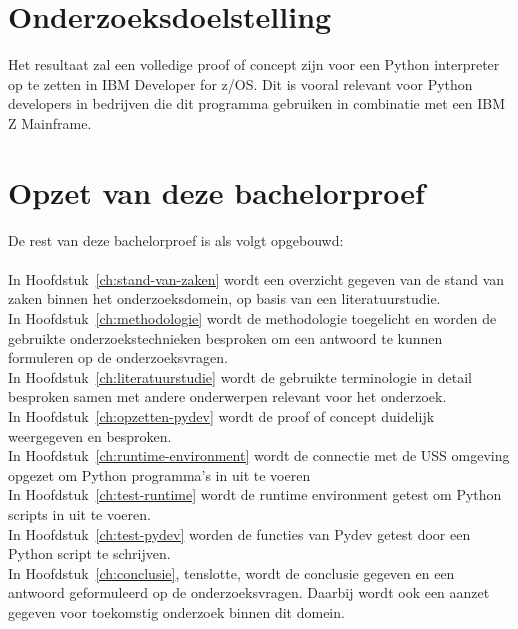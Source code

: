 \section{Onderzoeksdoelstelling}%
\label{sec:onderzoeksdoelstelling}

Het resultaat zal een volledige proof of concept zijn voor een Python interpreter op te zetten in IBM Developer for z/OS. Dit is vooral relevant voor Python developers in bedrijven die dit programma gebruiken in combinatie met een IBM Z Mainframe. 

\section{Opzet van deze bachelorproef}%
\label{sec:opzet-bachelorproef}


De rest van deze bachelorproef is als volgt opgebouwd: \\ \\

In Hoofdstuk~\ref{ch:stand-van-zaken} wordt een overzicht gegeven van de stand van zaken binnen het onderzoeksdomein, op basis van een literatuurstudie. \\

In Hoofdstuk~\ref{ch:methodologie} wordt de methodologie toegelicht en worden de gebruikte onderzoekstechnieken besproken om een antwoord te kunnen formuleren op de onderzoeksvragen. \\

In Hoofdstuk~\ref{ch:literatuurstudie} wordt de gebruikte terminologie in detail besproken samen met andere onderwerpen relevant voor het onderzoek. \\

In Hoofdstuk~\ref{ch:opzetten-pydev} wordt de proof of concept duidelijk weergegeven en besproken. \\

In Hoofdstuk~\ref{ch:runtime-environment} wordt de connectie met de USS omgeving opgezet om Python programma's in uit te voeren \\

In Hoofdstuk~\ref{ch:test-runtime} wordt de runtime environment getest om Python scripts in uit te voeren. \\

In Hoofdstuk~\ref{ch:test-pydev} worden de functies van Pydev getest door een Python script te schrijven. \\

In Hoofdstuk~\ref{ch:conclusie}, tenslotte, wordt de conclusie gegeven en een antwoord geformuleerd op de onderzoeksvragen. Daarbij wordt ook een aanzet gegeven voor toekomstig onderzoek binnen dit domein. \\